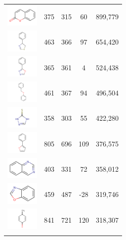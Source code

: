 \begin{longtable}{ccccc}
\includegraphics[width=60px]{data/badapple/scaf_07.png} & 375 & 315 & 60 & 899,779 \\
\includegraphics[width=60px]{data/badapple/scaf_08.png} & 463 & 366 & 97 & 654,420 \\
\includegraphics[width=60px]{data/badapple/scaf_09.png} & 365 & 361 & 4 & 524,438 \\
\includegraphics[width=60px]{data/badapple/scaf_10.png} & 461 & 367 & 94 & 496,504 \\
\includegraphics[width=60px]{data/badapple/scaf_11.png} & 358 & 303 & 55 & 422,280 \\
\includegraphics[width=60px]{data/badapple/scaf_12.png} & 805 & 696 & 109 & 376,575 \\
\includegraphics[width=60px]{data/badapple/scaf_13.png} & 403 & 331 & 72 & 358,012 \\
\includegraphics[width=60px]{data/badapple/scaf_14.png} & 459 & 487 & -28 & 319,746 \\
\includegraphics[width=60px]{data/badapple/scaf_15.png} & 841 & 721 & 120 & 318,307 \\
\hline
\label{table:ba_cmp_retro}
\end{longtable}


